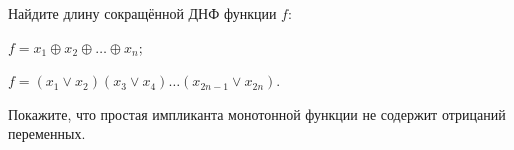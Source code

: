 \documentclass[12pt, a4paper]{article}
\begin{document}
\begin{problemList}
\smallskip

{Найдите длину сокращённой ДНФ функции $f$:}
{%
\begin{belarusianEnumerate}
    \item $f=x_1\oplus x_2\oplus \ldots \oplus x_n$;
    \item $f=(x_1\vee x_2)(x_3\vee x_4)\ldots(x_{2n-1}\vee x_{2n})$.
\end{belarusianEnumerate}
}

\smallskip

{Покажите, что простая импликанта монотонной функции не содержит отрицаний переменных.}

\end{problemList}
\end{document}
